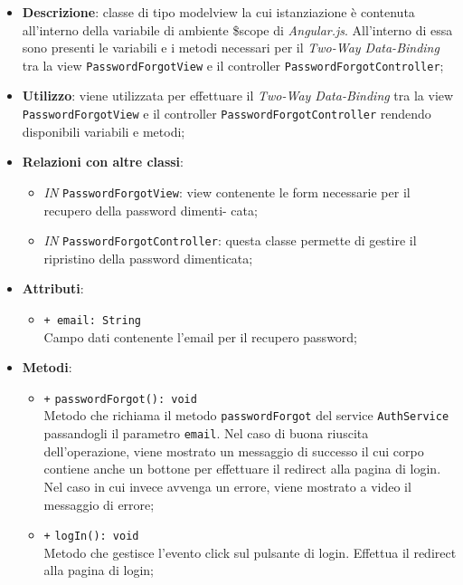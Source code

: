 	\begin{itemize}
		\item \textbf{Descrizione}: classe di tipo modelview la cui istanziazione è contenuta all'interno della variabile di ambiente \$scope di \textit{Angular.js}. All'interno di essa sono presenti le variabili e i metodi necessari per il \textit{Two-Way Data-Binding} tra la view \texttt{PasswordForgotView} e il controller \texttt{PasswordForgotController};
		\item \textbf{Utilizzo}: viene utilizzata per effettuare il \textit{Two-Way Data-Binding} tra la view \texttt{PasswordForgotView} e il controller \texttt{PasswordForgotController} rendendo disponibili variabili e metodi;
		\item \textbf{Relazioni con altre classi}: 
		\begin{itemize}
			\item \textit{IN} \texttt{PasswordForgotView}: view contenente le form necessarie per il recupero della password dimenti- cata; 
			\item \textit{IN} \texttt{PasswordForgotController}: questa classe permette di gestire il ripristino della password dimenticata;
		\end{itemize}
		\item \textbf{Attributi}: 
		\begin{itemize}
			\item \texttt{+ email: String} \\ Campo dati contenente l'email per il recupero password;
		\end{itemize}
		\item \textbf{Metodi}: 
		\begin{itemize}
			\item \texttt{+} \texttt{passwordForgot(): void} \\
			Metodo che richiama il metodo \texttt{passwordForgot} del service \texttt{AuthService} passandogli il parametro \texttt{email}. Nel caso di buona riuscita dell'operazione, viene mostrato un messaggio di successo il cui corpo contiene anche un bottone per effettuare il redirect alla pagina di login. Nel caso in cui invece avvenga un errore, viene mostrato a video il messaggio di errore;
			\item \texttt{+} \texttt{logIn(): void} \\
			Metodo che gestisce l’evento click sul pulsante di login. Effettua il redirect alla pagina di login;
		\end{itemize}
	\end{itemize}
	
